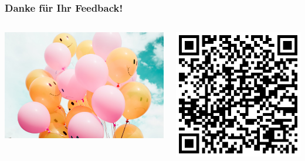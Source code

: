 \documentclass{beamer}
\begin{document}
\begin{frame}
\frametitle{Danke für Ihr Feedback!}

\begin{columns}[c]

\begin{column}{6cm}
\begin{center}
\includegraphics[width=\textwidth]{smilie_balloons.jpg}
\end{center}

\end{column}

\begin{column}{4cm}


\begin{center}
\includegraphics[width=\textwidth]{feedback_QR.png}
\end{center}
\end{column}


\end{columns}

\end{frame}
\end{document}
